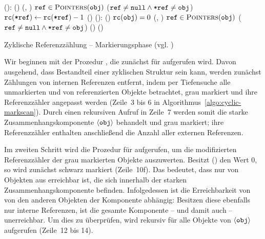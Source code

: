 \begin{algorithm}[h]
\begin{algorithmic}[1]
	\State {}():
	\State \quad \IF {}()
	\State \quad \quad {}(, )
	\State \quad \quad \FOREACH $\texttt{ref} \in \textsc{Pointers}(\texttt{obj})$
	\State \quad \quad \quad \IF ($\texttt{ref} \neq \texttt{null} \wedge \texttt{*ref} \neq \texttt{obj}$)	
	\State \quad \quad \quad \quad $\texttt{rc}(\texttt{*ref}) \gets \texttt{rc}(\texttt{*ref})-1$ 
	\State \quad \quad \quad \quad {}()	
	\Statex
	\State {}():
	\State \quad \IF {}()
	\State \quad \quad \IF $\texttt{rc}(\texttt{obj}) = 0$	
	\State \quad \quad \quad {}(, )
	\State \quad \quad \quad \FOREACH $\texttt{ref} \in \textsc{Pointers}(\texttt{obj})$
	\State \quad \quad \quad \quad \IF ($\texttt{ref} \neq \texttt{null} \wedge \texttt{*ref} \neq \texttt{obj}$)
	\State \quad \quad \quad \quad \quad {}()	
	\State \quad \quad \ELSE {}()	
\end{algorithmic}
\caption[Zyklische Referenzzählung -- Markierungsphase]{Zyklische Referenzzählung -- Markierungsphase (vgl. \cite[S. 32f]{martinez1990})}
\label{algo:cyclic-markscan}
\end{algorithm}

Wir beginnen mit der Prozedur , die zunächst für  aufgerufen wird.
Davon ausgehend, dass  Bestandteil einer zyklischen Struktur sein kann, werden zunächst Zählungen von internen Referenzen entfernt, indem per Tiefensuche alle unmarkierten und von  referenzierten Objekte betrachtet, grau markiert und ihre Referenzzähler angepasst werden (Zeile~3 bis 6 in Algorithmus~\ref{algo:cyclic-markscan}).
Durch einen rekursiven Aufruf in Zeile~7 werden somit die starke Zusammenhangskomponente $\left\langle\texttt{obj}\right\rangle$ behandelt und grau markiert; ihre Referenzzähler enthalten anschließend die Anzahl aller externen Referenzen.

Im zweiten Schritt wird die Prozedur  für  aufgerufen, um die modifizierten Referenzzähler der grau markierten Objekte auszuwerten.
Besitzt () den Wert $0$, so wird  zunächst schwarz markiert (Zeile~10f).
Das bedeutet, dass  nur von Objekten aus erreichbar ist, die sich innerhalb der starken Zusammenhangskomponente befinden.
Infolgedessen ist die Erreichbarkeit von  von den anderen Objekten der Komponente abhängig: Besitzen diese ebenfalls nur interne Referenzen, ist die gesamte Komponente -- und damit auch  -- unerreichbar.
Um dies zu überprüfen, wird  rekursiv für alle Objekte von $\left\langle\texttt{obj}\right\rangle$ aufgerufen (Zeile~12 bis 14).

